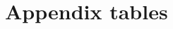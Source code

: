\documentclass[12pt,letterpaper]{article}
\begin{document}
%

\setcounter{figure}{0}
\setcounter{table}{0}
\renewcommand\thefigure{\Alph{section}.\arabic{figure}}
\renewcommand\thetable{\Alph{section}.\arabic{table}}
  
\section{Appendix tables}


%  
\end{document}
